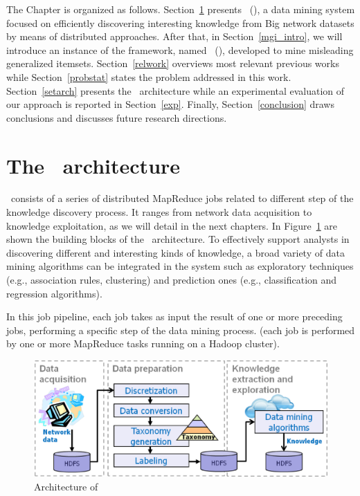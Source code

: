 The Chapter is organized as follows. Section~\ref{arch} presents \Nemico\ (\NemicoDef), a data mining system focused on efficiently discovering interesting knowledge from Big network datasets by means of distributed approaches.
After that, in Section~\ref{mgi_intro}, we will introduce an instance of the framework, named \SeTAB\ (\SeTA ), developed to mine misleading generalized itemsets.
Section~\ref{relwork} overviews most relevant previous works while Section~\ref{probstat} states the problem addressed in this
work. Section~\ref{setarch} presents the \SeTAB\ architecture while an experimental evaluation of our approach is reported in Section~\ref{exp}. Finally,
Section~\ref{conclusion} draws conclusions and discusses future research directions.


\section{The \Nemico\ architecture}
\label{arch}
\Nemico\ consists of a series of distributed MapReduce jobs related to different step of the knowledge discovery process. It ranges from network data acquisition to knowledge exploitation, as we will detail in the next chapters. 
In Figure~\ref{fig:arch} are shown the building blocks of the \Nemico\ architecture.
To effectively support analysts in discovering different and interesting kinds of knowledge, a broad variety of data mining algorithms can be integrated in the system such as exploratory techniques (e.g., association rules, clustering) and prediction ones (e.g., classification and regression algorithms). 

In this job pipeline, each job takes as input the result of one or more preceding jobs, performing a specific step of the data mining process.
(each job is performed by one or more MapReduce tasks running on a Hadoop cluster).


\begin{figure}
\centering
\includegraphics[width=1\textwidth]{chapters/nemico/Framework.eps}
\caption{Architecture of \Nemico}
\label{fig:arch}
\end{figure}



